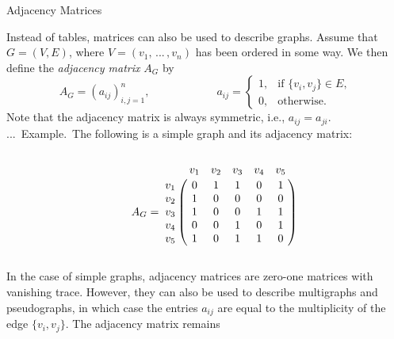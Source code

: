\documentclass[smaller,hyperref={CJKbookmarks=true}]{beamer}
\newcounter{zhuo}[subsection]
\renewcommand{\thezhuo}{\thesection.\thesubsection.\arabic{zhuo}}
\newenvironment{EXAMPLE}{\stepcounter{zhuo}\alert{\!\thezhuo.~Example.\,}}{}
\begin{document}
\begin{frame}{Adjacency Matrices}
\begin{spacing}{1.05}
Instead of tables, matrices can also be used to describe graphs. Assume
that $G=(V,E)$, where $V=(v_1,\,...\,,v_n)$ has been ordered in some way. We then define the \emph{adjacency matrix} $A_G$ by
\[A_G=(a_{ij})_{i,j=1}^n,\qquad\qquad\qquad
a_{ij}=\begin{cases}
         1, & \mbox{if }\{v_i,v_j\}\in E,  \\
         0, & \mbox{otherwise}.
       \end{cases}\]
Note that the adjacency matrix is always symmetric, i.e., $a_{ij}=a_{ji}$.\\[5pt]
\begin{EXAMPLE}
The following is a simple graph and its adjacency matrix:\\[5pt]
\begin{columns}[onlytextwidth]
\begin{column}{0.5\textwidth}
\begin{center}
\end{center}
\end{column}
\begin{column}{0.5\textwidth}
$A_G=\bordermatrix{%
& v_1 & v_2 & v_3 & v_4 & v_5 \cr
v_1 & 0 & 1 & 1 & 0 & 1 \cr
v_2 & 1 & 0 & 0 & 0 & 0 \cr
v_3 & 1 & 0 & 0 & 1 & 1 \cr
v_4 & 0 & 0 & 1 & 0 & 1 \cr
v_5 & 1 & 0 & 1 & 1 & 0 \cr
}$
\end{column}
\end{columns}
\end{EXAMPLE}
\newpage
\vspace*{9pt}
In the case of simple graphs, adjacency matrices are zero-one matrices
with vanishing trace. However, they can also be used to describe
multigraphs and pseudographs, in which case the entries $a_{ij}$ are equal to
the multiplicity of the edge $\{v_i,v_j\}$. The adjacency matrix remains

\end{spacing}
\end{frame}
\end{document}

